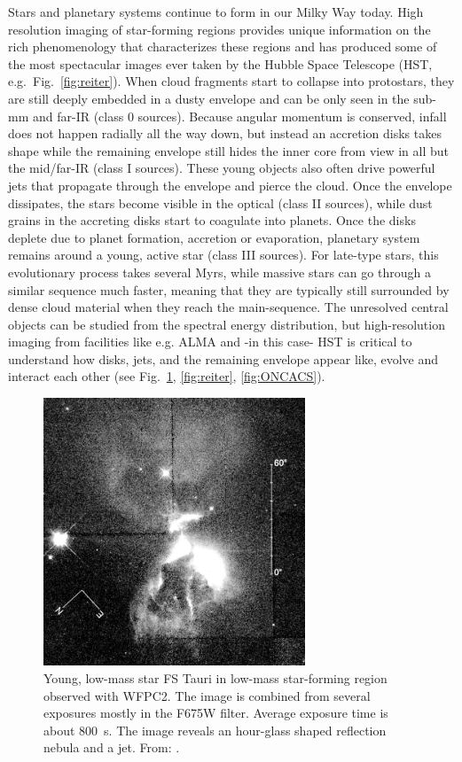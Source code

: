 \documentclass[12pt]{article}
\begin{document}
%
%
\justification          %
Stars and planetary systems continue to form in our Milky Way today. High resolution imaging of star-forming regions provides unique information on the rich phenomenology that characterizes these regions and has produced some of the most spectacular images ever taken by
the Hubble Space Telescope (HST, e.g.\ Fig.~\ref{fig:reiter}).
When cloud fragments start to collapse into protostars, they are still deeply
embedded in a dusty envelope and can be only seen in the sub-mm and far-IR (class
0 sources). Because angular momentum is conserved, infall does not happen
radially all the way down, but instead an accretion disks takes shape while
the remaining envelope still hides the inner core from view in all but the
mid/far-IR (class I sources).  These young objects also often drive powerful jets
that propagate through the envelope and pierce the cloud. Once the envelope
dissipates, the stars become visible in the optical  (class II sources), while dust grains in the accreting disks start to coagulate
into planets. Once the disks deplete due to planet formation, accretion or
evaporation, planetary system remains around a young, active star
(class III sources). For late-type stars, this evolutionary process takes several Myrs,
while massive stars can go through a similar sequence much faster, meaning that
they are typically still surrounded by dense cloud material when they reach the main-sequence.
The unresolved central objects can be studied from the spectral energy distribution, but
high-resolution imaging from facilities like e.g. ALMA and -in this case- HST  is critical to understand how disks, jets, and the remaining envelope
appear like, evolve and interact each other (see Fig.~\ref{fig:krist}, \ref{fig:reiter},  \ref{fig:ONCACS}).


\begin{figure}
    \centering
    \includegraphics[height=8cm]{Krist98.png}
    \caption{Young, low-mass star FS Tauri in low-mass star-forming region observed with WFPC2. The image is combined from several exposures mostly in the F675W filter. Average exposure time is about 800~s. The image reveals an hour-glass shaped reflection nebula and a jet. From: \citet{1998ApJ...501..841K}.}
    \label{fig:krist}
\end{figure}
\end{document}
